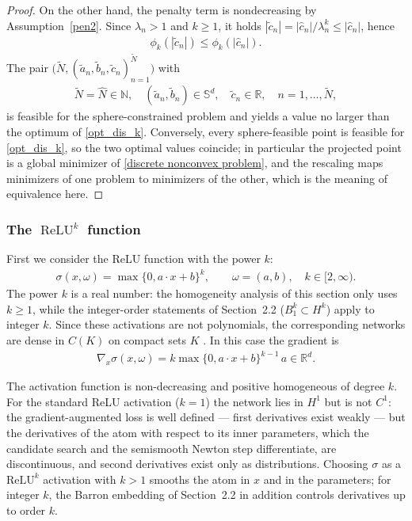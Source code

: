 \documentclass[11pt]{amsart}
\theoremstyle{definition}
\theoremstyle{remark}
\DeclareMathOperator{\relu}{ReLU}
\newcommand{\reluk}{\relu^{k}}
\begin{document}
\begin{proof}
    On the other hand, the penalty term is nondecreasing by Assumption~\ref{pen2}. Since $\lambda_n > 1$ and $k \ge 1$, it holds $|\tilde{c}_n| = |\hat{c}_n|/\lambda_n^k \le |\hat{c}_n|$, hence
	\begin{align*}
		\phi_k(|\tilde{c}_n|) \le \phi_k(|\hat{c}_n|).
	\end{align*}
	The pair $\bigg(\tilde{N}, (\tilde{a}_n, \tilde{b}_n, \tilde{c}_n)_{n = 1}^{\tilde{N}} \bigg)$ with
	\begin{align*}
		\tilde{N} = \hat{N} \in \mathbb{N},\quad (\tilde{a}_n,\tilde{b}_n) \in \mathbb{S}^d, \quad \tilde{c}_n \in \mathbb{R}, \quad n = 1, \dots, \tilde{N},
	\end{align*}
	is feasible for the sphere-constrained problem and yields a value no larger than the optimum of \eqref{opt_dis_k}. Conversely, every sphere-feasible point is feasible for \eqref{opt_dis_k}, so the two optimal values coincide; in particular the projected point is a global minimizer of \eqref{discrete nonconvex problem}, and the rescaling maps minimizers of one problem to minimizers of the other, which is the meaning of equivalence here.
\end{proof}

\subsubsection*{The $\reluk$ function}
First we consider the ReLU function with the power $k$:
\begin{align*}
	\sigma(x, \omega) = \max\{0, a \cdot x + b\}^{k}, \qquad \omega = (a, b), \quad k \in [2, \infty).
\end{align*}
The power $k$ is a real number: the homogeneity analysis of this section only uses $k \ge 1$, while the integer-order statements of Section~2.2 ($B_1^k \subset H^k$) apply to integer $k$.
Since these activations are not polynomials, the corresponding networks are dense in $C(K)$ on compact sets $K$ \cite{leshno1993multilayer}.
In this case the gradient is
\begin{align*}
	\nabla_x \sigma(x, \omega) = k \max\{0, a \cdot x + b \}^{k - 1}\, a \in \mathbb{R}^d.
\end{align*}

The activation function is non-decreasing and positive homogeneous of degree $k$.
For the standard ReLU activation ($k = 1$) the network lies in $H^1$ but is not $C^1$: the gradient-augmented loss is well defined --- first derivatives exist weakly --- but the derivatives of the atom with respect to its inner parameters, which the candidate search and the semismooth Newton step differentiate, are discontinuous, and second derivatives exist only as distributions.
Choosing $\sigma$ as a $\mathrm{ReLU}^k$ activation with $k > 1$ smooths the atom in $x$ and in the parameters; for integer $k$, the Barron embedding of Section~2.2 in addition controls derivatives up to order $k$.
\end{document}

